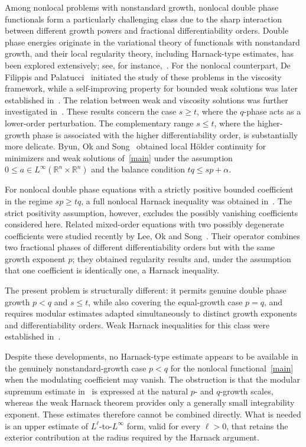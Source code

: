 \documentclass[reqno]{amsart}
\newcommand{\R}{\mathbb R}
\theoremstyle{plain}
\theoremstyle{definition}
\theoremstyle{remark}
\numberwithin{equation}{section}
\begin{document}
Among nonlocal problems with nonstandard growth, nonlocal double phase
functionals form a particularly challenging class due to the sharp interaction between different growth powers and fractional differentiability orders.
Double phase energies originate in the variational theory of functionals with
nonstandard growth, and their local regularity theory, including Harnack-type
estimates, has been explored extensively; see, for
instance,~\cite{BCM15,CM15a,CM15b}. For the nonlocal counterpart, De Filippis
and Palatucci~\cite{DP19} initiated the study of these problems in the
viscosity framework, while a self-improving property for bounded weak
solutions was later established in~\cite{SM22}. The relation between weak and
viscosity solutions was further investigated in~\cite{FZ23,GLZ26}. These
results concern the case \(s\ge t\), where the \(q\)-phase acts as a
lower-order perturbation. The complementary range \(s\le t\), where the
higher-growth phase is associated with the higher differentiability order, is
substantially more delicate. Byun, Ok and Song~\cite{BOS22} obtained local
H\"older continuity for minimizers and weak solutions of~\eqref{main} under
the assumption \(0\le a\in L^\infty(\R^n\times\R^n)\) and the balance
condition \(tq\le sp+\alpha\).

For nonlocal double phase equations with a strictly positive bounded
coefficient in the regime \(sp\ge tq\), a full nonlocal Harnack inequality was
obtained in~\cite{Kim25}. The strict positivity assumption, however, excludes
the possibly vanishing coefficients considered here. Related mixed-order
equations with two possibly degenerate coefficients were studied recently by
Lee, Ok and Song~\cite{LOS26}. Their operator combines two fractional phases
of different differentiability orders but with the same growth exponent
\(p\); they obtained regularity results and, under the assumption that one
coefficient is identically one, a Harnack inequality.

The present problem is structurally different: it permits genuine double
phase growth \(p<q\) and \(s\le t\), while also covering the equal-growth case
\(p=q\), and requires modular estimates adapted simultaneously to distinct
growth exponents and differentiability orders. Weak Harnack inequalities for
this class were established in~\cite{FKZ26}.


Despite these developments, no Harnack-type estimate appears to be available
in the genuinely nonstandard-growth case \(p<q\) for the nonlocal
functional~\eqref{main} when the modulating coefficient may vanish. The
obstruction is that the modular supremum estimate
in~\cite[Theorem~2.10]{FKZ26} is expressed at the natural \(p\)- and
\(q\)-growth scales, whereas the weak Harnack theorem provides only a
generally small integrability exponent. These estimates therefore cannot be
combined directly. What is needed is an upper estimate of
\(L^\ell\)-to-\(L^\infty\) form, valid for every \(\ell>0\), that retains the
exterior contribution at the radius required by the Harnack argument.
\end{document}
